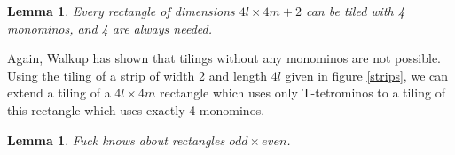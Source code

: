 \documentclass{article}
\theoremstyle{plain}
\newtheorem{lemma}[theorem]{Lemma}
\begin{document}
\begin{lemma}
Every rectangle of dimensions $4l \times 4m + 2$ can be tiled with 4 monominos, and 4 are always needed.
\end{lemma}
Again, Walkup has shown that tilings without any monominos are not possible. Using the tiling of a strip of width 2 and length $4l$ given in figure \ref{strips}, we can extend a tiling of a $4l \times 4m$ rectangle which uses only T-tetrominos to a tiling of this rectangle which uses exactly 4 monominos.

\begin{lemma}
Fuck knows about rectangles $odd \times even$.
\end{lemma}



{}

\end{document}
